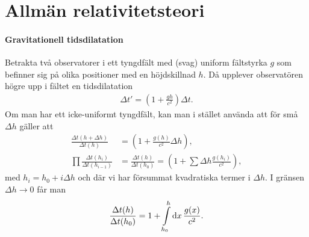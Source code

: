 \section{Allmän relativitetsteori}

\paragraph{Gravitationell tidsdilatation}
Betrakta två observatorer i ett tyngdfält med (svag) uniform fältstyrka $g$ som befinner sig på olika positioner med en höjdskillnad $h$. Då upplever observatören högre upp i fältet en tidsdilatation
\begin{align*}
	\Delta t' = (1 + \frac{gh}{c^{2}})\Delta t.
\end{align*}
Om man har ett icke-uniformt tyngdfält, kan man i stället använda att för små $\Delta h$ gäller att
\begin{align*}
	\frac{\Delta t(h + \Delta{h})}{\Delta t(h)}       &= (1 + \frac{g(h)}{c^{2}}\Delta{h}), \\
	\prod\frac{\Delta t(h_{i})}{\Delta t(h_{i - 1})}  &= \frac{\Delta t(h)}{\Delta t(h_{0})} = (1 + \sum\Delta{h}\frac{g(h_{i})}{c^{2}}),
\end{align*}
med $h_{i} = h_{0} + i\Delta{h}$ och där vi har försummat kvadratiska termer i $\Delta h$. I gränsen $\Delta h\to 0$ får man
\begin{align*}
	\frac{\Delta t(h)}{\Delta t(h_{0})} = 1 + \int\limits_{h_{0}}^{h}\dd{x}\frac{g(x)}{c^{2}}.
\end{align*}